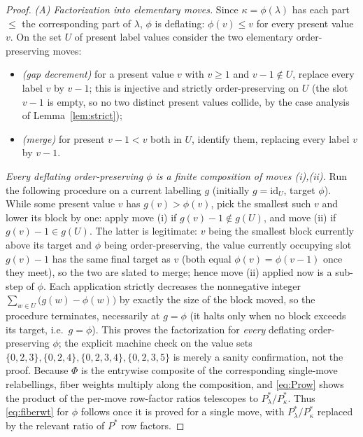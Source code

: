\begin{proof}
\emph{(A) Factorization into elementary moves.} Since $\kappa=\phi(\lambda)$ has each
part $\le$ the corresponding part of $\lambda$, $\phi$ is deflating: $\phi(v)\le v$
for every present value $v$. On the set $U$ of present label values consider the two
elementary order-preserving moves:
\begin{itemize}
\item[(i)] \emph{(gap decrement)} for a present value $v$ with $v\ge1$ and
$v-1\notin U$, replace every label $v$ by $v-1$; this is injective and strictly
order-preserving on $U$ (the slot $v-1$ is empty, so no two distinct present values
collide, by the case analysis of Lemma~\ref{lem:strict});
\item[(ii)] \emph{(merge)} for present $v-1<v$ both in $U$, identify them, replacing
every label $v$ by $v-1$.
\end{itemize}
\emph{Every deflating order-preserving $\phi$ is a finite composition of moves
\textup{(i)},\textup{(ii)}.} Run the following procedure on a current labelling $g$
(initially $g=\mathrm{id}_U$, target $\phi$). While some present value $v$ has
$g(v)>\phi(v)$, pick the smallest such $v$ and lower its block by one: apply move
\textup{(i)} if $g(v)-1\notin g(U)$, and move \textup{(ii)} if $g(v)-1\in g(U)$. The
latter is legitimate: $v$ being the smallest block currently above its target and
$\phi$ being order-preserving, the value currently occupying slot $g(v)-1$ has the
same final target as $v$ (both equal $\phi(v)=\phi(v-1)$ once they meet), so the two
are slated to merge; hence move \textup{(ii)} applied now is a sub-step of $\phi$.
Each application strictly decreases the nonnegative integer
$\sum_{w\in U}\bigl(g(w)-\phi(w)\bigr)$ by exactly the size of the block moved, so the
procedure terminates, necessarily at $g=\phi$ (it halts only when no block exceeds its
target, i.e.\ $g=\phi$). This proves the factorization for \emph{every} deflating
order-preserving $\phi$; the explicit machine check on the value sets
$\{0,2,3\},\{0,2,4\},\{0,2,3,4\},\{0,2,3,5\}$ is merely a sanity confirmation, not the
proof. Because $\Phi$ is the entrywise composite of the corresponding single-move
relabellings, fiber weights multiply along the composition, and \eqref{eq:Prow} shows
the product of the per-move row-factor ratios telescopes to $P^*_\lambda/P^*_\kappa$.
Thus \eqref{eq:fiberwt} for $\phi$ follows once it is proved for a single move, with
$P^*_\lambda/P^*_\kappa$ replaced by the relevant ratio of $P^*$ row factors.


\end{proof}
